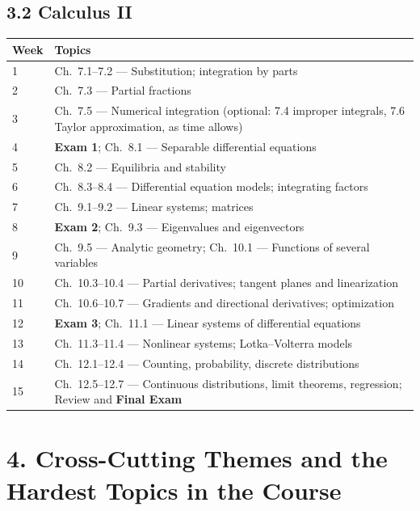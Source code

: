 \documentclass[11pt]{article}
\begin{document}
\subsection*{3.2 Calculus II}
\begin{longtable}{@{}p{}p{}@{}}
\toprule
\textbf{Week} & \textbf{Topics} \\
\midrule
\endhead
1 & Ch.\ 7.1--7.2 --- Substitution; integration by parts \\
2 & Ch.\ 7.3 --- Partial fractions \\
3 & Ch.\ 7.5 --- Numerical integration (optional: 7.4 improper integrals, 7.6 Taylor approximation, as time allows) \\
4 & \textbf{Exam 1}; Ch.\ 8.1 --- Separable differential equations \\
5 & Ch.\ 8.2 --- Equilibria and stability \\
6 & Ch.\ 8.3--8.4 --- Differential equation models; integrating factors \\
7 & Ch.\ 9.1--9.2 --- Linear systems; matrices \\
8 & \textbf{Exam 2}; Ch.\ 9.3 --- Eigenvalues and eigenvectors \\
9 & Ch.\ 9.5 --- Analytic geometry; Ch.\ 10.1 --- Functions of several variables \\
10 & Ch.\ 10.3--10.4 --- Partial derivatives; tangent planes and linearization \\
11 & Ch.\ 10.6--10.7 --- Gradients and directional derivatives; optimization \\
12 & \textbf{Exam 3}; Ch.\ 11.1 --- Linear systems of differential equations \\
13 & Ch.\ 11.3--11.4 --- Nonlinear systems; Lotka--Volterra models \\
14 & Ch.\ 12.1--12.4 --- Counting, probability, discrete distributions \\
15 & Ch.\ 12.5--12.7 --- Continuous distributions, limit theorems, regression; Review and \textbf{Final Exam} \\
\bottomrule
\end{longtable}

\section*{4. Cross-Cutting Themes and the Hardest Topics in the Course}
\end{document}
